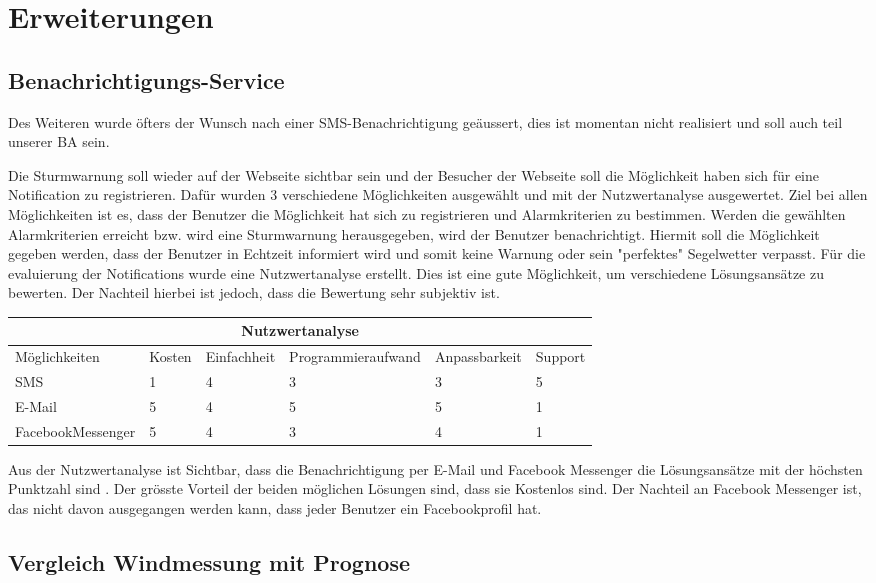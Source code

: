 \section{Erweiterungen}

\subsection{Benachrichtigungs-Service}
Des Weiteren wurde öfters der Wunsch nach einer SMS-Benachrichtigung geäussert, dies ist momentan nicht realisiert und soll auch teil unserer BA sein. 

Die Sturmwarnung soll wieder auf der Webseite sichtbar sein und der Besucher der Webseite soll die Möglichkeit haben sich für eine Notification zu registrieren. Dafür wurden 3 verschiedene Möglichkeiten ausgewählt und mit der Nutzwertanalyse ausgewertet. Ziel bei allen Möglichkeiten ist es, dass der Benutzer die Möglichkeit hat sich zu registrieren und Alarmkriterien zu bestimmen. Werden die gewählten Alarmkriterien erreicht bzw. wird eine Sturmwarnung herausgegeben, wird der Benutzer benachrichtigt. Hiermit soll die Möglichkeit gegeben werden, dass der Benutzer in Echtzeit informiert wird und somit keine Warnung oder sein "perfektes" Segelwetter verpasst. Für die evaluierung der Notifications wurde eine Nutzwertanalyse erstellt. Dies ist eine gute Möglichkeit, um verschiedene Lösungsansätze zu bewerten. Der Nachteil hierbei ist jedoch, dass die Bewertung sehr subjektiv ist. 

\begin{center}
\begin{tabular}{ |p{3.5cm}||p{1cm}|p{2cm}|p{3.5cm}|p{2.5cm}|p{1.5cm}|}
 \hline
 \multicolumn{6}{|c|}{Nutzwertanalyse} \\
 \hline
	Möglichkeiten & Kosten & Einfachheit & Programmieraufwand & Anpassbarkeit & Support\\
 \hline
	SMS & 1 & 4 & 3 & 3 & 5\\
	E-Mail & 5 & 4 & 5 & 5 & 1\\
	FacebookMessenger & 5 & 4 & 3 & 4 & 1\\
 
\hline
\end{tabular}
\end{center}

Aus der Nutzwertanalyse ist Sichtbar, dass die Benachrichtigung per E-Mail und Facebook Messenger die Lösungsansätze mit der höchsten Punktzahl sind . Der grösste Vorteil der beiden möglichen Lösungen sind, dass sie Kostenlos sind. Der Nachteil an Facebook Messenger ist, das nicht davon ausgegangen werden kann, dass jeder Benutzer ein Facebookprofil hat. 


\subsection{Vergleich Windmessung mit Prognose}
